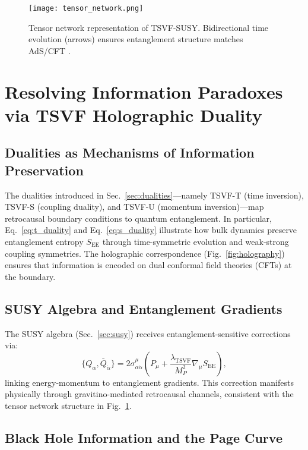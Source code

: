 \documentclass[twocolumn,superscriptaddress,floatfix]{revtex4-2}
\begin{document}
\begin{figure}[htbp]  
\centering  
\texttt{[image: tensor\_network.png]}  
\caption{Tensor network representation of TSVF-SUSY. Bidirectional time evolution (arrows) ensures entanglement structure matches AdS/CFT \cite{VanRaamsdonk2010}.}  
\label{fig:tensor_network}  
\end{figure}  

\section{Resolving Information Paradoxes via TSVF Holographic Duality}
\label{sec:info_paradox}

\subsection{Dualities as Mechanisms of Information Preservation}
\label{subsec:dual_preserve}

The dualities introduced in Sec.~\ref{sec:dualities}—namely TSVF-T (time inversion), TSVF-S (coupling duality), and TSVF-U (momentum inversion)—map retrocausal boundary conditions to quantum entanglement. In particular, Eq.~\ref{eq:t_duality} and Eq.~\ref{eq:s_duality} illustrate how bulk dynamics preserve entanglement entropy $S_{\text{EE}}$ through time-symmetric evolution and weak-strong coupling symmetries. The holographic correspondence (Fig.~\ref{fig:holography}) ensures that information is encoded on dual conformal field theories (CFTs) at the boundary.

\subsection{SUSY Algebra and Entanglement Gradients}
\label{subsec:susy_ent_grad}

The SUSY algebra (Sec.~\ref{sec:susy}) receives entanglement-sensitive corrections via:
\begin{equation}
\{Q_\alpha, \bar{Q}_{\dot{\alpha}}\} = 2\sigma^\mu_{\alpha\dot{\alpha}} \left( P_\mu + \frac{\lambda_{\text{TSVF}}}{M_P^2} \nabla_\mu S_{\text{EE}} \right),
\end{equation}
linking energy-momentum to entanglement gradients. This correction manifests physically through gravitino-mediated retrocausal channels, consistent with the tensor network structure in Fig.~\ref{fig:tensor_network}.

\subsection{Black Hole Information and the Page Curve}
\label{subsec:page_curve}
\end{document}

